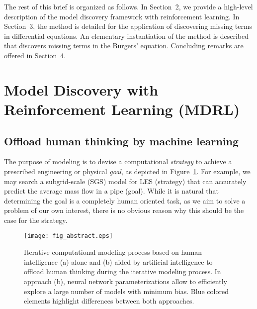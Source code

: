 \documentclass{article}
\begin{document}
The rest of this brief is organized as follows. In Section~2, we
provide a high-level description of the model discovery framework with
reinforcement learning. In Section~3, the method is detailed for the
application of discovering missing terms in differential equations. An
elementary instantiation of the method is described that discovers
missing terms in the Burgers' equation. Concluding remarks are offered
in Section~4.

\section{Model Discovery with Reinforcement Learning (MDRL)}
\label{sec:method}


\subsection{Offload human thinking by machine learning}


The purpose of modeling is to devise a computational \emph{strategy}
to achieve a prescribed engineering or physical \emph{goal}, as
depicted in Figure~\ref{fig:1}. For example, we may search a
subgrid-scale (SGS) model for LES (strategy) that can accurately
predict the average mass flow in a pipe (goal). While it is natural
that determining the goal is a completely human oriented task, as we aim to solve a
problem of our own interest, there is no obvious reason why this
should be the case for the strategy.
\begin{figure}
    \centering
    \vspace{5px}
    \texttt{[image: fig\_abstract.eps]}
    \caption{\label{fig:abstract} Iterative computational modeling process based on human intelligence (a) alone and (b) aided by artificial intelligence to offload human thinking during the iterative modeling process. In approach (b), neural network parameterizations allow to efficiently explore a large number of models with minimum bias. Blue colored elements highlight differences between both approaches. \label{fig:1}}
\end{figure}
\end{document}
